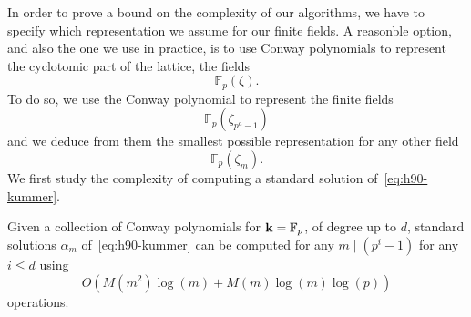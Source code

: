 In order to prove a bound on the complexity of our algorithms, we have to
specify which representation we assume for our finite fields. A reasonble
option, and also the one we use in practice, is to use Conway polynomials to
represent the cyclotomic part of the lattice, \ie the fields
\[
  \mathbb{F}_p(\zeta).
\]
To do so, we use the Conway polynomial to represent the finite fields
\[
  \mathbb{F}_p(\zeta_{p^a-1})
\]
and we deduce from them the smallest possible representation for any other field
\[
  \mathbb{F}_p(\zeta_m).
\]
We first study the complexity of computing a standard solution
of~\eqref{eq:h90-kummer}.
\begin{prop}
\label{prop:complexity-h90}
Given a collection of Conway polynomials for $\mathbf{k}=\mathbb{F}_p$, of degree up to
$d$, standard solutions $\alpha_m$ of~\eqref{eq:h90-kummer} can be computed
for any $m\mid(p^i-1)$ for any $i\leq d$ using
\[
  O(M(m^2)\log(m)+M(m)\log(m)\log(p))
\]
operations. 
\end{prop}
